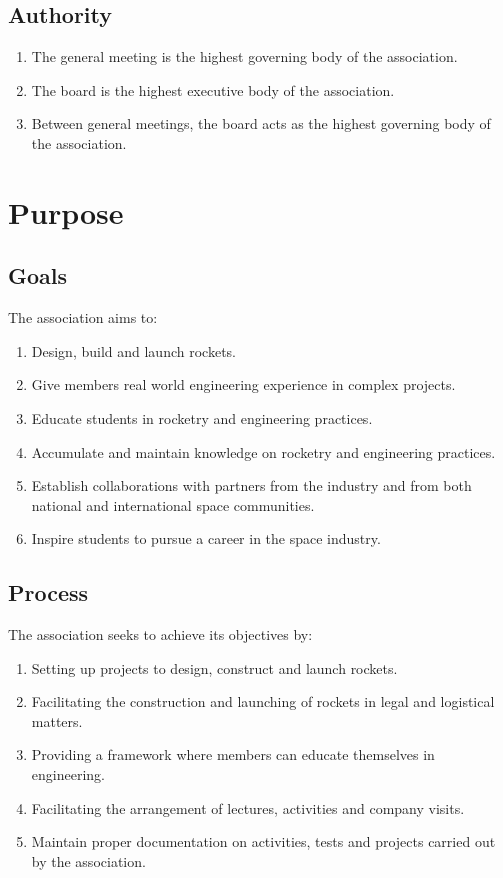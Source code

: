 \subsection{Authority}
\begin{enumerate}
  \item The general meeting is the highest governing body of the association.
  \item The board is the highest executive body of the association.
  \item Between general meetings, the board acts as the highest governing body of the association. 
\end{enumerate}

\section*{Purpose}

\subsection{Goals}
The association aims to:
\begin{enumerate}
  \item Design, build and launch rockets.
  \item Give members real world engineering experience in complex projects.
  \item Educate students in rocketry and engineering practices.
  \item Accumulate and maintain knowledge on rocketry and engineering practices.
  \item Establish collaborations with partners from the industry and from both national and international space communities.
  \item Inspire students to pursue a career in the space industry.
\end{enumerate}

\subsection{Process}
The association seeks to achieve its objectives by: 
\begin{enumerate}
  \item Setting up projects to design, construct and launch rockets.
  \item Facilitating the construction and launching of rockets in legal and logistical matters.
  \item Providing a framework where members can educate themselves in engineering.
  \item Facilitating the arrangement of lectures, activities and company visits.
  \item Maintain proper documentation on activities, tests and projects carried out by the association.
\end{enumerate}

